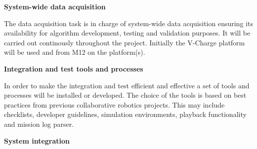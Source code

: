 {\begin{tasks}{\WPIntegrationNo}
\item  {\bf System-wide data acquisition}
     \label{task:wpper:car}
  
The data acquisition task is in charge of system-wide data acquisition ensuring its availability for algorithm development, testing and validation purposes. It will be carried out continously throughout the project. Initially the V-Charge platform will be used and from M12 on the \Project platform(s).  

\item {\bf Integration and test tools and processes}
\label{task:wpint:tools}

In order to make the integration and test efficient and effective a set of tools and processes will be installed or developed. The choice of the tools is based on best practices from previous collaborative robotics projects. This may include checklists, developer guidelines, simulation environments, playback functionality and mission log parser.

\item {\bf System integration}
\label{task:wpint:test}


\end{tasks}}
